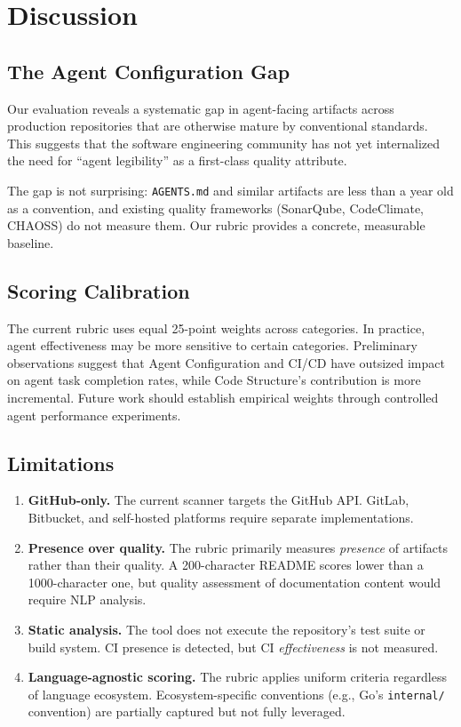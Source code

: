 \documentclass[11pt,twocolumn]{article}
\begin{document}
\section{Discussion}
\label{sec:discussion}

\subsection{The Agent Configuration Gap}

Our evaluation reveals a systematic gap in agent-facing artifacts across
production repositories that are otherwise mature by conventional
standards. This suggests that the software engineering community has
not yet internalized the need for ``agent legibility'' as a first-class
quality attribute.

The gap is not surprising: \texttt{AGENTS.md} and similar artifacts are
less than a year old as a convention, and existing quality frameworks
(SonarQube, CodeClimate, CHAOSS) do not measure them. Our rubric
provides a concrete, measurable baseline.

\subsection{Scoring Calibration}

The current rubric uses equal 25-point weights across categories. In
practice, agent effectiveness may be more sensitive to certain
categories. Preliminary observations suggest that Agent Configuration
and CI/CD have outsized impact on agent task completion rates, while
Code Structure's contribution is more incremental. Future work should
establish empirical weights through controlled agent performance
experiments.

\subsection{Limitations}

\begin{enumerate}[leftmargin=1.5em]
    \item \textbf{GitHub-only.} The current scanner targets the GitHub
          API. GitLab, Bitbucket, and self-hosted platforms require
          separate implementations.
    \item \textbf{Presence over quality.} The rubric primarily measures
          \emph{presence} of artifacts rather than their quality. A
          200-character README scores lower than a 1000-character one,
          but quality assessment of documentation content would require
          NLP analysis.
    \item \textbf{Static analysis.} The tool does not execute the
          repository's test suite or build system. CI presence is
          detected, but CI \emph{effectiveness} is not measured.
    \item \textbf{Language-agnostic scoring.} The rubric applies uniform
          criteria regardless of language ecosystem. Ecosystem-specific
          conventions (e.g., Go's \texttt{internal/} convention) are
          partially captured but not fully leveraged.
\end{enumerate}
\end{document}

